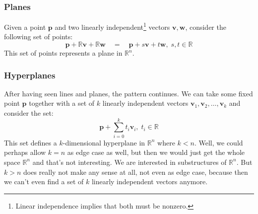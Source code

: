 


\subsubsection{Planes}
Given a point $\mathbf{p}$ and two linearly independent\footnote{Linear independence implies that both must be nonzero.} vectors $\mathbf{v, w}$, consider the following set of points:
\begin{equation}
 \mathbf{p} + \mathbb{R} \mathbf{v}  + \mathbb{R} \mathbf{w}
 \quad = \quad
 \mathbf{p} + s \mathbf{v} + t \mathbf{w}, \; s,t \in \mathbb{R}
\end{equation}
This set of points represents a plane in $\mathbb{R}^n$. 

\subsubsection{Hyperplanes}
After having seen lines and planes, the pattern continues. We can take some fixed point $\mathbf{p}$ together with a set of $k$ linearly independent vectors $\mathbf{v}_1, \mathbf{v}_2, \ldots, \mathbf{v}_k$ and consider the set:
\begin{equation}
 \mathbf{p} + \sum_{i=0}^{k} t_i \mathbf{v}_i, \; t_i \in \mathbb{R}
\end{equation}
This set defines a $k$-dimensional hyperplane in $\mathbb{R}^n$ where $k < n$. Well, we could perhaps allow $k=n$ as edge case as well, but then we would just get the whole space $\mathbb{R}^n$ and that's not interesting. We are interested in substructures of $\mathbb{R}^n$. But $k > n$ does really not make any sense at all, not even as edge case, because then we can't even find a set of $k$ linearly independent vectors anymore.


